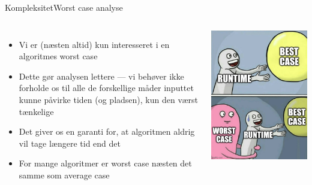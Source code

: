 \documentclass{beamer}
\begin{document}
\begin{frame}{Kompleksitet}{Worst case analyse}

    \begin{columns}
        \begin{itemize}
            \item Vi er (næsten altid) kun interesseret i en algoritmes worst
                case
            \item Dette gør analysen lettere --- vi behøver ikke forholde os
                til alle de forskellige måder inputtet kunne påvirke tiden (og
                pladsen), kun den værst tænkelige
            \item Det giver os en garanti for, at algoritmen aldrig vil tage
                længere tid end det
            \item For mange algoritmer er worst case næsten det samme som
                average case
        \end{itemize}

        \includegraphics[width=\linewidth]{worst-case}
    \end{columns}
    
\end{frame}
\end{document}
